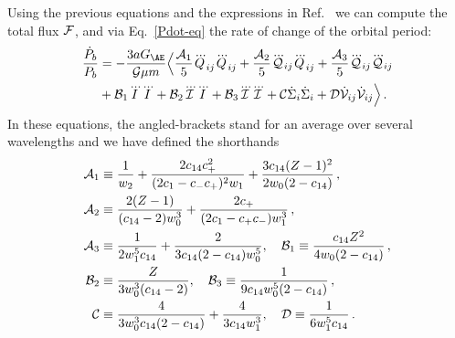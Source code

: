 \documentclass[prd,aps,twocolumn,nofootinbib,showpacs,superscriptaddress]{revtex4-1}
\newcommand{\nn}{\nonumber}
\begin{document}
Using  the previous equations and the expressions in Ref.~\cite{Foster:2006az,Foster:2007gr}  we can compute the total flux ${\cal{F}}$, and via Eq.~\eqref{Pdot-eq} the rate of change of the orbital period:
\begin{align}
\label{pdot-AE}
\frac{\dot{P}_{b}}{P_{b}}&=-\frac{3 a G_{\AE}}{{\cal{G}} \mu m}
\Big\langle \frac{{\cal A}_1}{5}\dddot Q_{ij}\dddot Q_{ij}+\frac{{\cal A}_2}{5}\dddot
     {\cal Q}_{ij}\dddot Q_{ij}  +\frac{{\cal A}_3}{5}\dddot{\cal Q}_{ij}\dddot{\cal Q}_{ij}
\nn \\ 
& 
+{\cal B}_1\dddot I \dddot
     I +{\cal B}_2\dddot {\cal I} \dddot I +{\cal B}_3\dddot {\cal I}
     \dddot {\cal I} +{\cal C}\dot \Sigma_i \dot\Sigma_i+{\cal D}\dot {\cal V}_{ij} \dot{\cal V}_{ij}\Big\rangle\,.
\end{align}
In these equations, the angled-brackets stand for an average over several
wavelengths and we have defined the shorthands
\begin{align}
\label{A-funcs-1}
{\cal A}_1 &\equiv \frac{1}{w_2}+\frac{2 c_{14} c_+^2}{(2c_1-c_- c_+)^2 w_1}+\frac{3 c_{14}(Z-1)^2}{2 w_0(2-c_{14})}\,,  
\\ 
{\cal A}_2 &\equiv \frac{2(Z-1)}{(c_{14}-2)w_0^3}+\frac{2 c_+}{(2c_1-c_+c_-)w_1^3}\,,  
\\ 
\label{A-funcs-3}
{\cal A}_3 &\equiv\frac{1}{2 w_1^5 c_{14}}+ \frac{2}{3c_{14}(2-c_{14})w_0^5}, \quad {\cal B}_1\equiv
\frac{c_{14} Z^2}{4 w_0(2-c_{14})}\,,  
\\ 
{\cal B}_2 &\equiv \frac{Z}{3 w_0^3(c_{14}-2)},\quad  {\cal B}_3 \equiv \frac{1}{9c_{14}
  w_0^5(2-c_{14})}\,, 
\\ 
\label{C-func}
{\cal C} &\equiv \frac{4}{3 w_0^3
  c_{14}(2-c_{14})}+\frac{4}{3 c_{14} w_1^3},\quad {\cal D}\equiv \frac{1}{6 w^5_1 c_{14}}\,.
\end{align}
\end{document}
